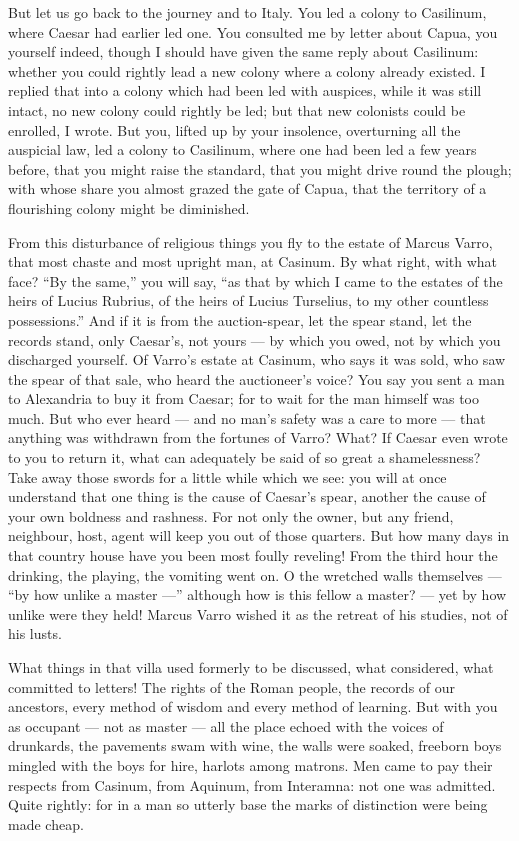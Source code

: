  But let us go back to the journey and to Italy. You led a colony to Casilinum, where Caesar had earlier led one. You consulted me by letter about Capua, you yourself indeed, though I should have given the same reply about Casilinum: whether you could rightly lead a new colony where a colony already existed. I replied that into a colony which had been led with auspices, while it was still intact, no new colony could rightly be led; but that new colonists could be enrolled, I wrote. But you, lifted up by your insolence, overturning all the auspicial law, led a colony to Casilinum, where one had been led a few years before, that you might raise the standard, that you might drive round the plough; with whose share you almost grazed the gate of Capua, that the territory of a flourishing colony might be diminished.

 From this disturbance of religious things you fly to the estate of Marcus Varro, that most chaste and most upright man, at Casinum. By what right, with what face? ``By the same,'' you will say, ``as that by which I came to the estates of the heirs of Lucius Rubrius, of the heirs of Lucius Turselius, to my other countless possessions.'' And if it is from the auction-spear, let the spear stand, let the records stand, only Caesar's, not yours --- by which you owed, not by which you discharged yourself. Of Varro's estate at Casinum, who says it was sold, who saw the spear of that sale, who heard the auctioneer's voice? You say you sent a man to Alexandria to buy it from Caesar; for to wait for the man himself was too much. But who ever heard --- and no man's safety was a care to more --- that anything was withdrawn from the fortunes of Varro? What? If Caesar even wrote to you to return it, what can adequately be said of so great a shamelessness? Take away those swords for a little while which we see: you will at once understand that one thing is the cause of Caesar's spear, another the cause of your own boldness and rashness. For not only the owner, but any friend, neighbour, host, agent will keep you out of those quarters. But how many days in that country house have you been most foully reveling! From the third hour the drinking, the playing, the vomiting went on. O the wretched walls themselves --- ``by how unlike a master ---'' although how is this fellow a master? --- yet by how unlike were they held! Marcus Varro wished it as the retreat of his studies, not of his lusts.

 What things in that villa used formerly to be discussed, what considered, what committed to letters! The rights of the Roman people, the records of our ancestors, every method of wisdom and every method of learning. But with you as occupant --- not as master --- all the place echoed with the voices of drunkards, the pavements swam with wine, the walls were soaked, freeborn boys mingled with the boys for hire, harlots among matrons. Men came to pay their respects from Casinum, from Aquinum, from Interamna: not one was admitted. Quite rightly: for in a man so utterly base the marks of distinction were being made cheap.

